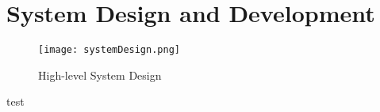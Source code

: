 \section{System Design and Development}
\begin{figure*}[!t]
	\centering
	\texttt{[image: systemDesign.png]}
	\caption{High-level System Design}
	\label{systemDesign}
\end{figure*}

test



